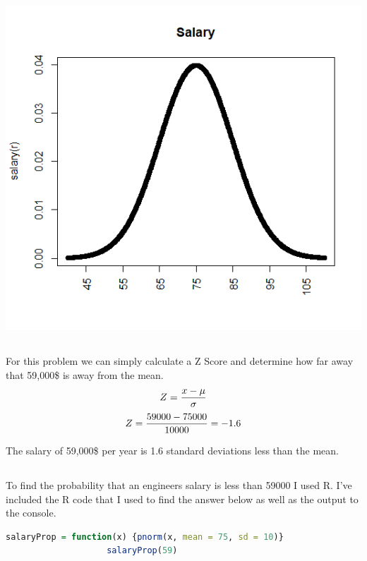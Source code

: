 \documentclass[letterpaper, onecolumn,10pt]{IEEEtran}
\begin{document}
                \includegraphics{week2/plot.png}
                
            \subsection{}
                For this problem we can simply calculate a Z Score and determine how far away that 59,000\$ is away from the mean.\\
                
                \[
                    Z = \frac{x - \mu}{\sigma}\\
                \]
                \[
                    Z = \frac{59000 - 75000}{10000} = -1.6\\
                \]
                
                The salary of 59,000\$ per year is 1.6 standard deviations less than the mean.\\
                
            \subsection{}
                To find the probability that an engineers salary is less than 59000 I used R. I've included the R code that I used to find the answer below as well as the output to the console.
                
                \begin{lstlisting}[language=R]
                    salaryProp = function(x) {pnorm(x, mean = 75, sd = 10)}
                    salaryProp(59)
                \end{lstlisting}
                
\end{document}
